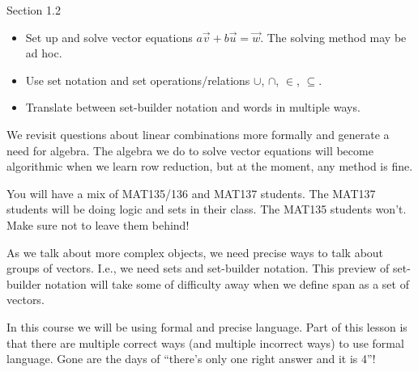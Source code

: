 \begin{lesson}

	Section 1.2

	\begin{itemize}
		\item Set up and solve vector equations $a\vec v+b\vec u=\vec w$. The solving
			method may be ad hoc.
		\item Use set notation and set operations/relations $\cup$, $\cap$, $\in$, $\subseteq$.
		\item Translate between set-builder notation and words in multiple ways.
	\end{itemize}

	We revisit questions about linear combinations more formally and generate a need for
	algebra. The algebra we do to solve vector equations will become algorithmic when
	we learn row reduction, but at the moment, any method is fine.

	\begin{annotation}
		\begin{notes}
			You will have a mix of MAT135/136 and MAT137 students.
			The MAT137 students will be doing logic and sets in their
			class. The MAT135 students won't. Make sure not to leave them
			behind!
		\end{notes}
	\end{annotation}
	As we talk about more complex objects, we need precise ways to talk about
	groups of vectors. I.e., we need sets and set-builder notation. This preview of set-builder
	notation will take some of difficulty away when we define span as a set of vectors.

	In this course we will be using formal and precise language. Part of this lesson
	is that there are multiple correct ways (and multiple incorrect ways) to use formal
	language. Gone are the days of ``there's only one right answer and it is 4''!

\end{lesson}

